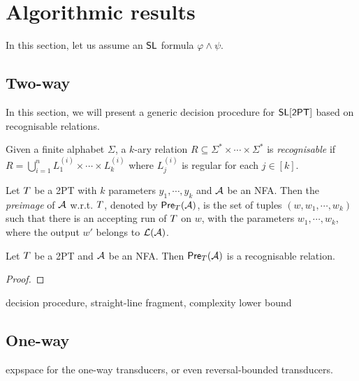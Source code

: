 
\section{Algorithmic results}
\label{sec:algo}

In this section, let us assume an $\textsf{SL}$ formula $\varphi \wedge \psi$.



\subsection{Two-way}


In this section, we will present a generic decision procedure for $\textsf{SL}[\textsf{2PT}]$ based on recognisable relations.

\begin{definition}
	Given a finite alphabet $\Sigma$, a $k$-ary relation $R\subseteq \Sigma^*\times \cdots\times \Sigma^*$ is \emph{recognisable}  if $R=\bigcup_{i=1}^n L^{(i)}_1\times \cdots\times L^{(i)}_k$ where $L^{(i)}_j$ is regular for each $j\in [k]$.
%
\end{definition}

Let $T$ be a 2PT with $k$ parameters $y_1,\cdots, y_k$ and $\mathcal{A}$ be an NFA. Then the \emph{preimage} of $\mathcal{A}$ w.r.t. $T$, denoted by $\textsf{Pre}_{T}(\mathcal{A})$, is the set of tuples $(w, w_1,\cdots, w_k)$ such that there is an accepting run of $T$ on $w$, with the parameters $w_1,\cdots, w_k$, where the output $w'$ belongs to $\mathcal{L}(\mathcal{A})$.


\begin{lemma}
Let $T$ be a 2PT and $\mathcal{A}$ be an NFA. Then $\textsf{Pre}_{T}(\mathcal{A})$ is a recognisable relation.
\end{lemma}

\begin{proof}
\end{proof}



decision procedure, straight-line fragment, complexity lower bound

\subsection{One-way}

expspace for the one-way transducers, or even reversal-bounded transducers.


